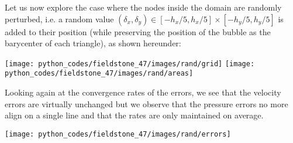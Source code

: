 Let us now explore the case where the nodes inside the domain are randomly perturbed, i.e. 
a random value  $(\delta_x,\delta_y)\in[-h_x/5,h_x/5]\times[-h_y/5,h_y/5]$ is added 
to their position (while preserving the position of the bubble as the barycenter of each triangle), 
as shown hereunder:

\begin{center}
\texttt{[image: python\_codes/fieldstone\_47/images/rand/grid]}
\texttt{[image: python\_codes/fieldstone\_47/images/rand/areas]}
\end{center}
 
Looking again at the convergence rates of the errors, we see that the velocity errors 
are virtually unchanged but we observe that the pressure errors no more align on a
single line and that the rates are only maintained on average. 

\begin{center}
\texttt{[image: python\_codes/fieldstone\_47/images/rand/errors]}
\end{center}

